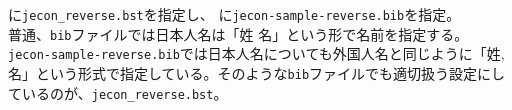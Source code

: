 \documentclass[10pt]{jarticle}
\begin{document}
\verb||に\verb|jecon_reverse.bst|を指定し、
\verb||に\verb|jecon-sample-reverse.bib|を指定。
\vspace{1em}\\
普通、\verb|bib|ファイルでは日本人名は「姓 名」という形で名前を指定する。
\verb|jecon-sample-reverse.bib|では日本人名についても外国人名と同じように「姓,
名」という形式で指定している。そのような\verb|bib|ファイルでも適切扱う設定にしているのが、\verb|jecon_reverse.bst|。
\vspace{1em}\\



\nocite{*}


% 


\end{document}
